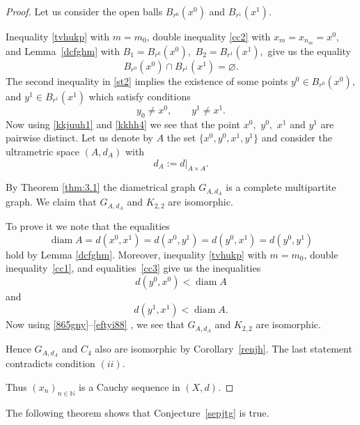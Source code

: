 \documentclass[11pt]{article}
\theoremstyle{definition}
\theoremstyle{remark}
\numberwithin{equation}{section}
\begin{document}
\begin{proof}
Let us consider the open balls $B_{r^0}(x^0)$ and $B_{r^1}(x^1)$.  

Inequality \eqref{tvhukp} with $m=m_0$, double inequality \eqref{cc2}  with $x_m=x_{n_m} = x^0$, and Lemma~\ref{dcfghm} with 
    $B_1 = B_{r^0}(x^0),$ $ B_2 = B_{r^1}(x^1),$
 give us the equality
\begin{equation}
    \label{kkjuuh1}
    B_{r^0}(x^0) \cap B_{r^1}(x^1) = \varnothing.
\end{equation}
The second inequality in \eqref{st2} implies the existence of some points
$
y^0 \in B_{r^0}(x^0),$ and $ y^1 \in B_{r^1}(x^1)
$
which satisfy conditions
\begin{equation}
\label{kkhh4}
y_0 \neq x^0, \qquad y^1 \neq x^1. 
\end{equation}
Now using \eqref{kkjuuh1} and \eqref{kkhh4} we see that the point $x^0,$ $y^0,$ $x^1$ and $y^1$ are pairwise distinct.
Let us denote by $A$ the set $\{x^0, y^0, x^1, y^1\}$ and consider the ultrametric space $(A, d_A)$ with
\[
d_A := d\big|_{A \times A}.
\]

By Theorem \ref{thm:3.1} the diametrical graph $G_{A,d_A}$ is a complete multipartite graph.  
We claim that $G_{A,d_A}$ and $K_{2,2}$ are isomorphic.

To prove it we note that the equalities
\begin{equation}
    \label{865gny}
\operatorname{diam} A=d(x^0, x^1) = d(x^0, y^1) = d(y^0, x^1) = d(y^0, y^1)
\end{equation}
hold by Lemma \ref{dcfghm}.
Moreover, inequality \eqref{tvhukp} with $m=m_0$, double inequality~\eqref{cc1}, 
and equalities~\eqref{cc3} give us the inequalities
\begin{equation}
    \label{vnhgefk}
d(y^0,x^0) <\operatorname{diam} A
\end{equation}
and
\begin{equation}
\label{eftyi88}
d(y^1,x^1) <\operatorname{diam} A. 
\end{equation}
Now using \eqref{865gny}--\eqref{eftyi88} , we see that $G_{A,d_A}$ and $K_{2,2}$ are isomorphic.  

Hence $G_{A,d_A}$ and $C_4$ also are isomorphic by Corollary~\ref{renjh}.  
The last statement contradicts condition $(ii)$.  

Thus $(x_n)_{n \in \mathbb{N}}$ is a Cauchy sequence in $(X,d)$. 


\end{proof}




The following theorem shows that Conjecture~\ref{sepjtg} is true.
\end{document}

